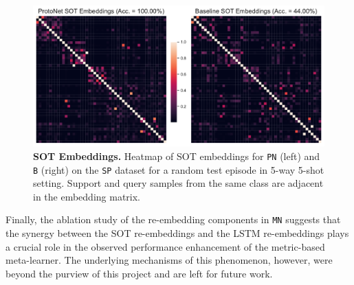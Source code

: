 \begin{figure}[h!]
    \centering
    \includegraphics[width=1\columnwidth]{figures/sot-embeddings.pdf}
    \caption{\textbf{SOT Embeddings.} Heatmap of SOT embeddings for \texttt{PN} (left) and \texttt{B} (right) on the \texttt{SP} dataset for a random test episode in 5-way 5-shot setting. Support and query samples from the same class are adjacent in the embedding matrix.}
    \label{fig:sot-embeddings}
\end{figure}

Finally, the ablation study of the re-embedding components in \texttt{MN} suggests that the synergy between the SOT re-embeddings and the LSTM re-embeddings plays a crucial role in the observed performance enhancement of the metric-based meta-learner. The underlying mechanisms of this phenomenon, however, were beyond the purview of this project and are left for future work.

